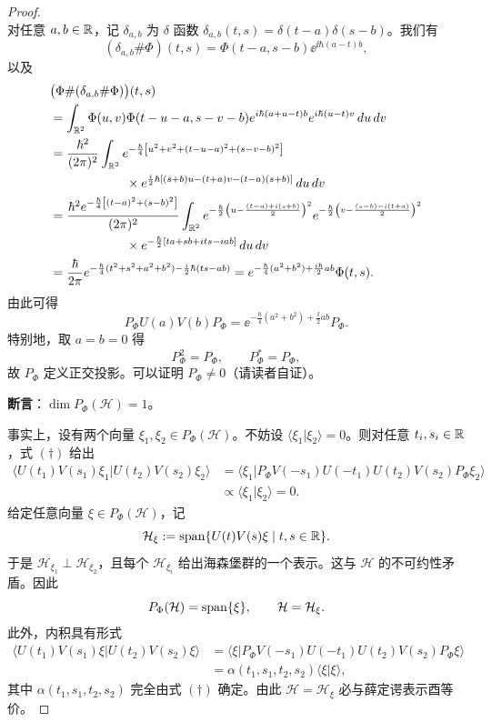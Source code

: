 \begin{proof}
\[  \]
  对任意 $a,b\in\mathbb{R}$，记 $\delta_{a,b}$ 为 $\delta$ 函数 $\delta_{a,b}(t,s)=\delta(t-a)\delta(s-b)$。我们有
  \[
  (\delta_{a,b}\#\Phi)(t,s)=\Phi(t-a,s-b)\ee^{\ii\hbar(a-t)b},
  \]
  以及
  \begin{align*}
  &\bigl(\Phi\#(\delta_{a,b}\#\Phi)\bigr)(t,s)\\
  &=\int_{\mathbb{R}^2}\Phi(u,v)\Phi(t-u-a,s-v-b)e^{i\hbar(a+u-t)b}e^{i\hbar(u-t)v}\,d u\,d v\\
  &=\frac{\hbar^2}{(2\pi)^2}\int_{\mathbb{R}^2}
  e^{-\frac{\hbar}{4}\left[u^2+v^2+(t-u-a)^2+(s-v-b)^2\right]}\\
  &\qquad\qquad\qquad\times
  e^{\frac{i}{2}\hbar\left[(s+b)u-(t+a)v-(t-a)(s+b)\right]}\,d u\,d v\\
  &=\frac{\hbar^2e^{-\frac{\hbar}{4}\left[(t-a)^2+(s-b)^2\right]}}{(2\pi)^2}
  \int_{\mathbb{R}^2}e^{-\frac{\hbar}{2}\left(u-\frac{(t-a)+i(s+b)}{2}\right)^2}
  e^{-\frac{\hbar}{2}\left(v-\frac{(s-b)-i(t+a)}{2}\right)^2}\\
  &\qquad\qquad\qquad\times
  e^{-\frac{\hbar}{2}[ta+sb+i ts-i ab]}\,d u\,d v\\
  &=\frac{\hbar}{2\pi}e^{-\frac{\hbar}{4}(t^2+s^2+a^2+b^2)-\frac{i}{2}\hbar(ts-ab)}
  =e^{-\frac{\hbar}{4}(a^2+b^2)+\frac{i\hbar}{2}ab}\Phi(t,s).
  \end{align*}
  由此可得
  \[
  P_\Phi U(a)V(b)P_\Phi=\ee^{-\frac{\hbar}{4}(a^2+b^2)+\frac{\ii}{2}ab}P_\Phi. \tag{$\dagger$}
  \]
  特别地，取 $a=b=0$ 得
  \[
  P_\Phi^2=P_\Phi,\qquad P_\Phi^*=P_\Phi,
  \]
  故 $P_\Phi$ 定义正交投影。可以证明 $P_\Phi\ne0$（请读者自证）。

  \textbf{断言}：$\dim P_\Phi(\mathcal{H})=1$。

  事实上，设有两个向量 $\xi_1,\xi_2\in P_\Phi(\mathcal{H})$。不妨设 $\langle\xi_1|\xi_2\rangle=0$。则对任意 $t_i,s_i\in\mathbb{R}$，式 $(\dagger)$ 给出
  \[
  \begin{aligned}
  \langle U(t_1)V(s_1)\xi_1|U(t_2)V(s_2)\xi_2\rangle
  &=\langle\xi_1|P_\Phi V(-s_1)U(-t_1)U(t_2)V(s_2)P_\Phi\xi_2\rangle\\
  &\propto\langle\xi_1|\xi_2\rangle=0.
  \end{aligned}
  \]
  给定任意向量 $\xi\in P_\Phi(\mathcal{H})$，记
  \[
  \mathcal{H}_\xi:=\operatorname{span}\{U(t)V(s)\xi\mid t,s\in\mathbb{R}\}.
  \]
  于是 $\mathcal{H}_{\xi_1}\perp\mathcal{H}_{\xi_2}$，且每个 $\mathcal{H}_{\xi_i}$ 给出海森堡群的一个表示。这与 $\mathcal{H}$ 的不可约性矛盾。因此
  \[
  P_\Phi(\mathcal{H})=\operatorname{span}\{\xi\},\qquad \mathcal{H}=\mathcal{H}_\xi.
  \]
  此外，内积具有形式
  \[
  \begin{aligned}
  \langle U(t_1)V(s_1)\xi|U(t_2)V(s_2)\xi\rangle
  &=\langle\xi|P_\Phi V(-s_1)U(-t_1)U(t_2)V(s_2)P_\Phi\xi\rangle\\
  &=\alpha(t_1,s_1,t_2,s_2)\langle\xi|\xi\rangle,
  \end{aligned}
  \]
  其中 $\alpha(t_1,s_1,t_2,s_2)$ 完全由式 $(\dagger)$ 确定。由此 $\mathcal{H}=\mathcal{H}_\xi$ 必与薛定谔表示酉等价。
\end{proof}

